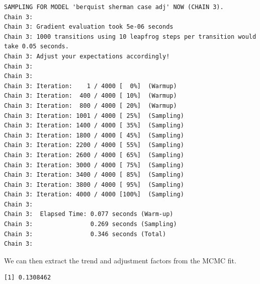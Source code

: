 \documentclass[
  letterpaper,
  DIV=11,
  numbers=noendperiod]{scrartcl}
\newenvironment{Shaded}{\begin{snugshade}}{\end{snugshade}}
\newcommand{\AttributeTok}[1]{\textcolor[rgb]{0.40,0.45,0.13}{#1}}
\newcommand{\FunctionTok}[1]{\textcolor[rgb]{0.28,0.35,0.67}{#1}}
\newcommand{\NormalTok}[1]{\textcolor[rgb]{0.00,0.23,0.31}{#1}}
\newcommand{\OtherTok}[1]{\textcolor[rgb]{0.00,0.23,0.31}{#1}}
\newcommand{\SpecialCharTok}[1]{\textcolor[rgb]{0.37,0.37,0.37}{#1}}
\begin{document}
\begin{verbatim}
SAMPLING FOR MODEL 'berquist sherman case adj' NOW (CHAIN 3).
Chain 3: 
Chain 3: Gradient evaluation took 5e-06 seconds
Chain 3: 1000 transitions using 10 leapfrog steps per transition would take 0.05 seconds.
Chain 3: Adjust your expectations accordingly!
Chain 3: 
Chain 3: 
Chain 3: Iteration:    1 / 4000 [  0%]  (Warmup)
Chain 3: Iteration:  400 / 4000 [ 10%]  (Warmup)
Chain 3: Iteration:  800 / 4000 [ 20%]  (Warmup)
Chain 3: Iteration: 1001 / 4000 [ 25%]  (Sampling)
Chain 3: Iteration: 1400 / 4000 [ 35%]  (Sampling)
Chain 3: Iteration: 1800 / 4000 [ 45%]  (Sampling)
Chain 3: Iteration: 2200 / 4000 [ 55%]  (Sampling)
Chain 3: Iteration: 2600 / 4000 [ 65%]  (Sampling)
Chain 3: Iteration: 3000 / 4000 [ 75%]  (Sampling)
Chain 3: Iteration: 3400 / 4000 [ 85%]  (Sampling)
Chain 3: Iteration: 3800 / 4000 [ 95%]  (Sampling)
Chain 3: Iteration: 4000 / 4000 [100%]  (Sampling)
Chain 3: 
Chain 3:  Elapsed Time: 0.077 seconds (Warm-up)
Chain 3:                0.269 seconds (Sampling)
Chain 3:                0.346 seconds (Total)
Chain 3: 
\end{verbatim}

We can then extract the trend and adjustment factors from the MCMC fit.

\begin{Shaded}
\end{Shaded}

\begin{verbatim}
[1] 0.1308462
\end{verbatim}
\end{document}
